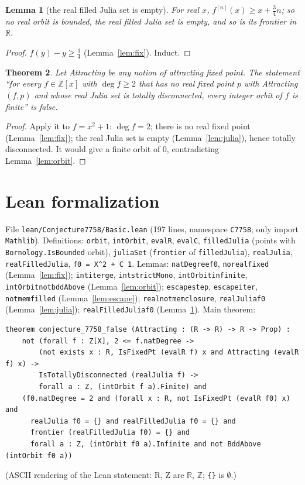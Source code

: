 \documentclass[11pt]{article}
\renewcommand{\_}{\oldus\allowbreak}
\newtheorem{theorem}{Theorem}
\newtheorem{lemma}[theorem]{Lemma}
\theoremstyle{definition}
\theoremstyle{remark}
\newcommand{\Z}{\mathbb{Z}}
\newcommand{\R}{\mathbb{R}}
\begin{document}
\begin{lemma}[the real filled Julia set is empty]\label{lem:realfilled}
For real $x$, $f^{[n]}(x) \ge x + \tfrac34 n$; so no real orbit is bounded, the real filled Julia set
is empty, and so is its frontier in $\R$.
\end{lemma}
\begin{proof}
$f(y) - y \ge \tfrac34$ (Lemma~\ref{lem:fix}). Induct.
\end{proof}

\begin{theorem}\label{thm:main}
Let \textup{Attracting} be any notion of attracting fixed point. The statement ``for every $f \in
\Z[x]$ with $\deg f \ge 2$ that has no real fixed point $p$ with \textup{Attracting}$(f,p)$ and whose real
Julia set is totally disconnected, every integer orbit of $f$ is finite'' is false.
\end{theorem}
\begin{proof}
Apply it to $f = x^2+1$: $\deg f = 2$; there is no real fixed point (Lemma~\ref{lem:fix}); the real
Julia set is empty (Lemma~\ref{lem:julia}), hence totally disconnected. It would give a finite orbit of
$0$, contradicting Lemma~\ref{lem:orbit}.
\end{proof}

\section{Lean formalization}\label{sec:lean}

File \texttt{lean/Conjecture7758/Basic.lean} (197 lines, namespace \texttt{C7758}; only import
\texttt{Mathlib}). Definitions: \texttt{orbit}, \texttt{intOrbit}, \texttt{evalR}, \texttt{evalC},
\texttt{filledJulia} (points with \texttt{Bornology.IsBounded} orbit), \texttt{juliaSet}
(\texttt{frontier} of \texttt{filledJulia}), \texttt{realJulia}, \texttt{realFilledJulia},
\texttt{f0 = X\^{}2 + C 1}. Lemmas: \texttt{natDegree\_f0}, \texttt{no\_real\_fixed}
(Lemma~\ref{lem:fix}); \texttt{int\_iter\_ge}, \texttt{int\_strictMono}, \texttt{intOrbit\_infinite},
\texttt{intOrbit\_not\_bddAbove} (Lemma~\ref{lem:orbit}); \texttt{escape\_step}, \texttt{escape\_iter},
\texttt{not\_mem\_filled} (Lemma~\ref{lem:escape}); \texttt{real\_not\_mem\_closure},
\texttt{realJulia\_f0} (Lemma~\ref{lem:julia}); \texttt{realFilledJulia\_f0}
(Lemma~\ref{lem:realfilled}). Main theorem:

\begin{verbatim}
theorem conjecture_7758_false (Attracting : (R -> R) -> R -> Prop) :
    not (forall f : Z[X], 2 <= f.natDegree ->
        (not exists x : R, IsFixedPt (evalR f) x and Attracting (evalR f) x) ->
        IsTotallyDisconnected (realJulia f) ->
        forall a : Z, (intOrbit f a).Finite) and
    (f0.natDegree = 2 and (forall x : R, not IsFixedPt (evalR f0) x) and
      realJulia f0 = {} and realFilledJulia f0 = {} and
      frontier (realFilledJulia f0) = {} and
      forall a : Z, (intOrbit f0 a).Infinite and not BddAbove (intOrbit f0 a))
\end{verbatim}
(ASCII rendering of the Lean statement: R, Z are $\R$, $\Z$; \texttt{\{\}} is $\emptyset$.)
\end{document}
